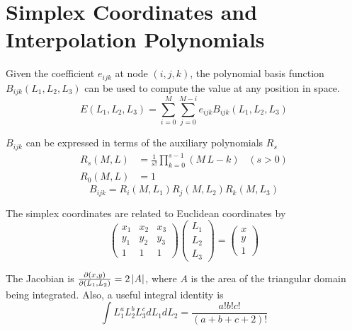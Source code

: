 \documentclass[main]{subfiles}
\begin{document}
\section{Simplex Coordinates and Interpolation Polynomials}
\label{Simplex Coordinates and Interpolation Polynomials}
Given the coefficient $e_{ijk}$ at node $(i,j,k)$, the polynomial basis 
function $B_{ijk}(L_1,L_2,L_3)$ can be used to compute the value at any 
position in space.
\begin{equation*}
	E(L_1,L_2,L_3)=\sum\limits_{i=0}^M\sum\limits_{j=0}^{M-i}
	e_{ijk}B_{ijk}(L_1,L_2,L_3)
\end{equation*}

$B_{ijk}$ can be expressed in terms of the auxiliary polynomials $R_s$
\begin{align*}
	R_s(M,L)&=\frac{1}{s!}\prod\limits_{k=0}^{s-1}(M\,L-k)\,\,\,\,\,(s>0) \\
	R_0(M,L)&=1
\end{align*}
\begin{equation*}
	B_{ijk}=R_i(M,L_1)R_j(M,L_2)R_k(M,L_3)
\end{equation*}

The simplex coordinates are related to Euclidean coordinates by
\begin{equation*}
	\begin{pmatrix}
		x_1 & x_2 & x_3	\\
		y_1 & y_2 & y_3	\\
		1   & 1   & 1
	\end{pmatrix}
	\begin{pmatrix}
		L_1 \\ L_2 \\ L_3
	\end{pmatrix}
	=
	\begin{pmatrix}
		x \\ y \\ 1
	\end{pmatrix}
\end{equation*}

The Jacobian is $\frac{\partial (x,y)}{\partial (L_1,L_2)}=2\left| A \right|$, where $A$ is the area of the
triangular domain being integrated. Also, a useful integral identity is
\begin{equation*}
	\int L_1^a L_2^b L_3^c dL_1 dL_2=\frac{a!b!c!}{(a+b+c+2)!}
\end{equation*}

\end{document}
